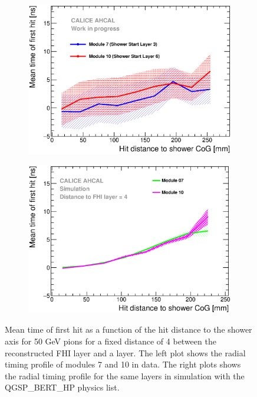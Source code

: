 \documentclass[12pt]{article}
\begin{document}
\begin{figure}[htbp!]
	\begin{subfigure}[t]{0.49\textwidth}
		\centering
		\includegraphics[width=1\textwidth]{../../Draft/fig/Timing_Radius_Comparison_ShortAsymRange_ShowerStart.eps}
		\caption{}\label{fig:Radius_FHI}
	\end{subfigure}
	\hfill
	\begin{subfigure}[t]{0.49\textwidth}
		\centering
		\includegraphics[width=1\textwidth]{../../Draft/fig/Radius_ShowerStartTruth.eps}
		\caption{}\label{fig:Radius_FHISim1}
	\end{subfigure}
	\caption{Mean time of first hit as a function of the hit distance to the shower axis for 50 GeV pions for a fixed distance of 4 between the reconstructed FHI layer and a layer. The left plot shows the radial timing profile of modules 7 and 10 in data. The right plots shows the radial timing profile for the same layers in simulation with the QGSP\_BERT\_HP physics list.}
	\label{fig:Radius_FHIAll}
\end{figure}
\end{document}
